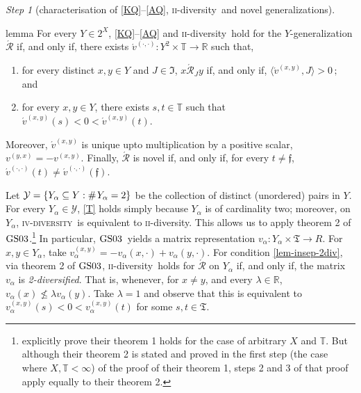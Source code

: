 \documentclass[ecta,nameyear,draft]{econsocart}
\newcommand{\countof}{\mathbin{\#}\hskip1pt}
\newcommand{\R}{\mathbb R}
\newcommand{\mc}{\mathcal}
\newcommand{\novel}{\mathfrak f}
\newcommand{\aext}{\mathrel{\acute{\mathrel{\mathcal R}}}}
\newcommand{\mbbt}{{\mathds {T}}}
\newcommand{\mbbtpp}{{\mathfrak{T}}}
\newcommand{\mbbjpp}{\mathfrak{I}}
\newcommand{\xy}{{(x, y)}}
\newcommand{\yx}{{(y, x)}}
\newcommand{\dd}{{(\cdot,\cdot)}}
\newcommand{\twodiv}{\textsc{ii}-\textup{diversity}}
\newcommand{\fourdiv}{\textsc{iv}-\textsc{diversity}}
\newcommand{\gsii}{$\textup{GS03}$}
\theoremstyle{plain}
\theoremstyle{remark}
\newtheorem{step}{Step}[section]
\begin{document}
\begin{appendix}
\begin{step}[characterisation of \ref{KQ}–\ref{AQ}, \twodiv\ and novel
      generalizations]
    \begin{theoremEnd}{lemma}\label{lem-insep} For every $Y \in 2^{X}$,
      \ref{KQ}--\ref{AQ} and \twodiv\ hold for the $Y$-generalization $\aext$
      if, and only if, there exists $\acute{v}^{\dd}: Y^2 \times \mbbt
      \rightarrow \R$ such that,
      \begin{enumerate}[label=\textup{(\roman*)}]
        \item\label{lem-insep-rep} for every distinct $x, y \in Y$ and $J \in
          \mbbjpp$, $x \aext_J y$ if, and only if, $\langle \acute{v}^{\xy},
          J \rangle > 0$$\,;$ \textup{and}
        \item\label{lem-insep-2div} for every $x, y \in Y$, there exists $s, t
          \in \mbbt$ such that $\acute{v}^{\xy}(s) < 0 < \acute{v}^{\xy}(t)$.
      \end{enumerate}
      Moreover, $\acute{v}^{\xy}$ is unique upto multiplication by a positive
      scalar,  $v^{\yx} = - v^{\xy}$. Finally,  $\aext$ is novel if, and only
      if, for every $t \neq \novel$, $\acute{v}^{\dd}(t) \neq
      \acute{v}^{\dd}(\novel)$.
    \end{theoremEnd}

    \begin{proofEnd}
      Let $\mc Y = \{Y_\alpha \subseteq Y : \countof Y_\alpha = 2\}$ be the
      collection of distinct (unordered) pairs in $Y$. For every $Y_\alpha \in
      \mc Y$, \ref{T} holds simply because $Y_\alpha$ is of cardinality two;
      moreover, on $Y_\alpha$, \fourdiv\ is equivalent to \twodiv. This allows
      us to apply theorem 2 of \gsii.\footnote{\citeauthor{gilboa2003inductive}
        explicitly prove their theorem 1 holds for the case of arbitrary $X$
        and $\mbbt$. But although their theorem 2 is stated and proved in the
        first step (the case where $X, \mbbt < \infty$) of the proof of their
        theorem 1, steps 2 and 3 of that proof apply equally to their theorem
      2.}  In particular, \gsii\ yields a matrix representation $v_\alpha :
      Y_\alpha \times \mbbtpp \rightarrow R$. For $x, y \in Y_\alpha$, take
      $v^{\xy}_{\alpha} = - v_{\alpha}(x, \cdot) + v_{\alpha}(y, \cdot)$. 
      For condition \ref{lem-insep-2div}, via theorem 2 of \gsii, \twodiv\
      holds for $\aext$ on $Y_\alpha$ if, and only if, the matrix $v_\alpha$
      is \emph{2-diversified}. That is, whenever, for $x\neq y$, and every
      $\lambda \in \R$, $v_\alpha (x) \not \leq \lambda v_\alpha(y)$. Take
      $\lambda = 1$ and observe that this is equivalent to
      $v^{\xy}_{\alpha}(s) < 0 < v^{\xy}_{\alpha}(t)$ for some $s, t \in
      \mbbtpp$.
    

\end{proofEnd}
\end{step}
\end{appendix}
\end{document}
